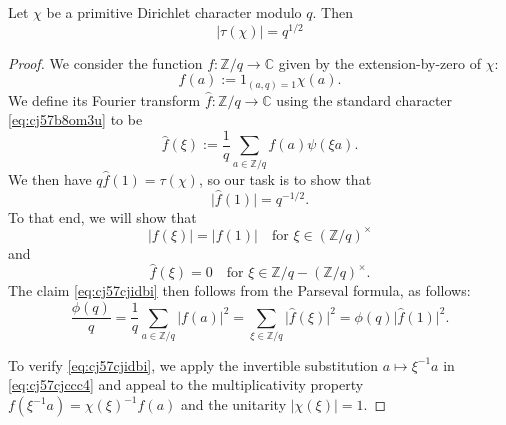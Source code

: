 \documentclass[reqno]{amsart}  \numberwithin{theorem}{section} \numberwithin{equation}{section}
\begin{document}
\begin{theorem}\label{theorem:cj57ckejar}
  Let $\chi$ be a primitive Dirichlet character modulo $q$.  Then
  \begin{equation*}
\lvert \tau(\chi)  \rvert = q^{1/2} 
\end{equation*}
\end{theorem}
\begin{proof}
  We consider the function $f : \mathbb{Z} / q \rightarrow \mathbb{C}$ given by the extension-by-zero of $\chi$:
  \begin{equation*}
    f(a) := 1_{(a, q) = 1} \chi(a).
  \end{equation*}
  We define its Fourier transform $\hat{f} : \mathbb{Z} / q \rightarrow \mathbb{C}$ using the standard character \eqref{eq:cj57b8om3u} to be
  \begin{equation}\label{eq:cj57cjccc4}
    \hat{f}(\xi) := \frac{1}{q} \sum_{a \in \mathbb{Z} / q} f (a) \psi (\xi a).
  \end{equation}
  We then have $q \hat{f}(1) = \tau(\chi)$, so our task is to show that
  \begin{equation*}
    \lvert \hat{f} (1)  \rvert = q^{-1/2}.
  \end{equation*}
  To that end, we will show that
  \begin{equation}\label{eq:cj57cjidbi}
    \lvert f(\xi) \rvert = \lvert f(1) \rvert \quad \text{for } \xi \in (\mathbb{Z} / q)^\times 
  \end{equation}
  and
  \begin{equation}\label{eq:cj57cjmbi7}
    \hat{f}(\xi) = 0 \quad \text{for } \xi \in \mathbb{Z} / q - (\mathbb{Z} / q )^\times .
  \end{equation}
  The claim \eqref{eq:cj57cjidbi} then follows from the Parseval formula, as follows:
  \begin{equation*}
    \frac{\phi(q)}{q}
    =
    \frac{1}{q} \sum_{a \in \mathbb{Z} / q} \lvert f (a)  \rvert^2
    = \sum_{\xi \in \mathbb{Z} / q} \lvert \hat{f} (\xi)  \rvert^2
    = \phi (q) \lvert \hat{f} (1) \rvert^2.
  \end{equation*}

  To verify \eqref{eq:cj57cjidbi}, we apply the invertible substitution $a \mapsto \xi^{-1} a$ in \eqref{eq:cj57cjccc4} and appeal to the multiplicativity property $f (\xi^{-1} a) = \chi (\xi )^{-1} f (a) $ and the unitarity $\lvert \chi (\xi ) \rvert = 1$.


\end{proof}
\end{document}
